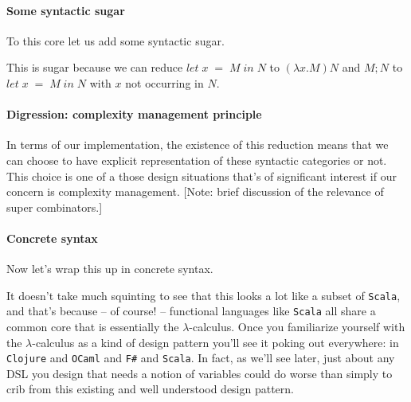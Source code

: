 \paragraph{Some syntactic sugar}
To this core let us add some syntactic sugar.


This is sugar because we can reduce $let \; x \; = \; M \; in \; N$ to
$(\lambda x. M) N$ and $ M; N$ to $let \; x \; = \; M \; in \; N$ with
$x$ not occurring in $N$.

\paragraph{Digression: complexity management principle} In terms of
our implementation, the existence of this reduction means that we can
choose to have explicit representation of these syntactic categories
or not. This choice is one of a those design situations that's of
significant interest if our concern is complexity management. [Note:
brief discussion of the relevance of super combinators.]

\paragraph{Concrete syntax}
Now let's wrap this up in concrete syntax.


It doesn't take much squinting to see that this looks a lot like a
subset of \texttt{Scala}, and that's because -- of course! --
functional languages like \texttt{Scala} all share a common core that
is essentially the $\lambda$-calculus. Once you familiarize yourself
with the $\lambda$-calculus as a kind of design pattern you'll see it
poking out everywhere: in \texttt{Clojure} and \texttt{OCaml} and
\texttt{F\#} and \texttt{Scala}. In fact, as we'll see later, just
about any DSL you design that needs a notion of variables could do
worse than simply to crib from this existing and well understood
design pattern.

